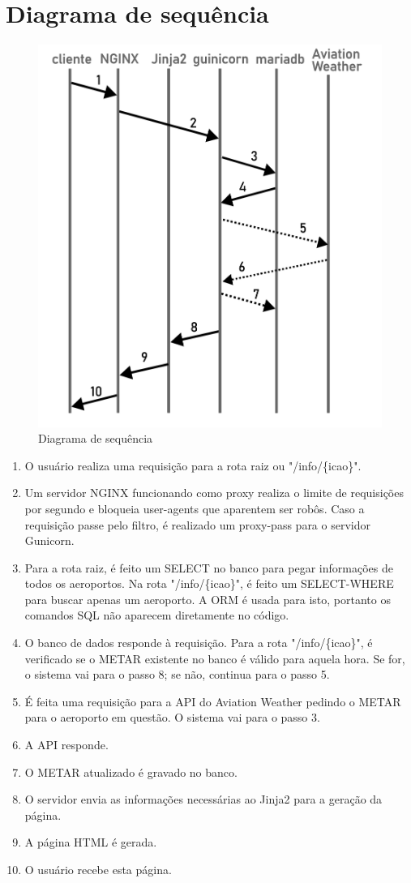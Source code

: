 \section{Diagrama de sequência}

\begin{figure}[ht]
    \begin{center}
    \includegraphics[width=0.5\linewidth]{img/diagrama-tempo.png}
    \caption{Diagrama de sequência}
    \label{fig:tempo}
    \end{center}
\end{figure}

\begin{enumerate}
\item O usuário realiza uma requisição para a rota raiz ou "/info/\{icao\}".
\item Um servidor NGINX funcionando como proxy realiza o limite de requisições por segundo
e bloqueia user-agents que aparentem ser robôs. Caso a requisição passe pelo filtro, é
realizado um proxy-pass para o servidor Gunicorn.
\item Para a rota raiz, é feito um SELECT no banco para pegar informações de todos os
aeroportos. Na rota "/info/\{icao\}", é feito um SELECT-WHERE para buscar apenas um aeroporto.
A ORM é usada para isto, portanto os comandos SQL não aparecem diretamente no código.
\item O banco de dados responde à requisição. Para a rota "/info/\{icao\}", é verificado 
se o METAR existente no banco é válido para aquela hora. Se for, o sistema vai para o passo 8;
se não, continua para o passo 5.
\item É feita uma requisição para a API do Aviation Weather pedindo o METAR para o 
aeroporto em questão. O sistema vai para o passo 3.
\item A API responde.
\item O METAR atualizado é gravado no banco.
\item O servidor envia as informações necessárias ao Jinja2 para a geração da página.
\item A página HTML é gerada.
\item O usuário recebe esta página.
\end{enumerate}
